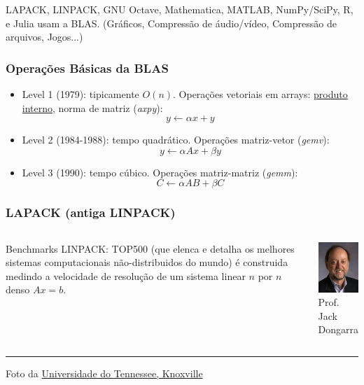\documentclass{beamer}
\begin{document}
\begin{darkframes}
\begin{frame}
    LAPACK, LINPACK, GNU Octave, Mathematica, MATLAB, NumPy/SciPy, R, e Julia usam a BLAS. (Gráficos, Compressão de áudio/vídeo, Compressão de arquivos, Jogos...)
  \end{frame}
  
  \begin{frame}[label=blas]
    \frametitle{Operações Básicas da BLAS}
    \begin{itemize}
    \item Level 1 (1979): tipicamente $O(n)$. Operações vetoriais em arrays: \hyperlink{pi}{produto interno}, norma de matriz (\emph{axpy}):
      \begin{equation*}
        y \leftarrow \alpha x + y
      \end{equation*}
    \item Level 2 (1984-1988): tempo quadrático. Operações matriz-vetor (\emph{gemv}):
      \begin{equation*}
        y \leftarrow \alpha A x + \beta y
      \end{equation*}
    \item Level 3 (1990): tempo cúbico. Operações matriz-matriz (\emph{gemm}):
      \begin{equation*}
        C \leftarrow \alpha A B + \beta C
      \end{equation*}
    \end{itemize}
  \end{frame}

  \begin{frame}
    \frametitle{LAPACK (antiga LINPACK)}
    \begin{columns}
      \column{5cm}
      Benchmarks LINPACK: TOP500 (que elenca e detalha os melhores sistemas computacionais não-distribuidos do mundo) é construida medindo a velocidade de resolução de um sistema linear $n$ por $n$ denso $Ax = b$.
      \column{4cm}
      \begin{center}
        \includegraphics[width=3.8cm]{figures/JackDongarra.jpg}\\
        Prof. Jack Dongarra
      \end{center}
    \end{columns}
    \vfill
    \hrule
    \vskip0.2cm
    \footnotesize{Foto da \href{https://commons.wikimedia.org/w/index.php?curid=5234147}{Universidade do Tennessee, Knoxville}}
  \end{frame}
  

\end{darkframes}
\end{document}
